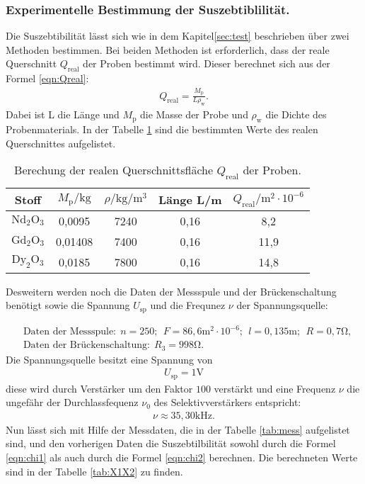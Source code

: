 \subsubsection{Experimentelle Bestimmung der Suszebtiblilität.}
Die Suszebtibilität lässt sich wie in dem Kapitel\ref{sec:test} beschrieben über zwei Methoden bestimmen. Bei beiden Methoden ist
erforderlich, dass der reale Querschnitt $Q_\mathrm{real}$ der Proben bestimmt wird.
Dieser berechnet sich aus der Formel \eqref{eqn:Qreal}:
\begin{align}
  Q_\mathrm{real}=\frac{M_\mathrm{p}}{L\rho_\mathrm{w}}\label{eqn:Qreal}.
\end{align}
Dabei ist L die Länge und $M_\mathrm{p}$ die Masse der Probe und
$\rho_\mathrm{w}$ die Dichte des Probenmaterials.
In der Tabelle \ref{tab:Q} sind die bestimmten Werte des realen Querschnittes aufgelistet.
\begin{table}
  \centering
  \caption{Berechung der realen Querschnittsfläche $Q_\mathrm{real}$ der Proben.}
  \label{tab:Q}
  \begin{tabular}{c c c c c}
  Stoff &  $M_\mathrm{p}/\si{\kilo\gram}$ & $\rho/\si{\kilo\gram\per\meter\tothe{3}}$ & Länge L/\si{\meter} & $Q_\mathrm{real}/\si{\meter\tothe{2}}\cdot 10^{-6}$\\
     \midrule
     $\mathrm{Nd_2O_3}$ & 0,0095  & 7240 & 0,16 & 8,2\\
     $\mathrm{Gd_2O_3}$ & 0,01408 & 7400 & 0,16 & 11,9\\
     $\mathrm{Dy_2O_3}$ & 0,0185  & 7800 & 0,16 & 14,8\\
     \bottomrule
  \end{tabular}
\end{table}
\FloatBarrier
Desweitern werden noch die Daten der Messspule und der Brückenschaltung benötigt sowie
die Spannung $U_\mathrm{sp}$ und die Frequnez $\nu$ der Spannungsquelle:

\begin{align*}
&\text{Daten der Messspule:}  \ \ n=250; \  \ F=86,6\si{\meter\tothe{2}}\cdot10^{-6}; \ \ l=0,135\si{\meter}; \ \ R= 0,7\si{\ohm}, \\
&\text{Daten der Brückenschaltung:} \ \  R_3=998\si{\ohm}.\
\end{align*}
Die Spannungsquelle besitzt eine Spannung von
\begin{align*}
U_\mathrm{sp}=1\si{\volt}
\end{align*}
diese wird durch Verstärker um den Faktor $100$ verstärkt
und eine Frequenz $\nu$ die ungefähr der Durchlassfequenz $\nu_0$
des Selektivverstärkers entspricht:
\begin{align*}
\nu\approx35,30\si{\kilo\hertz}.
\end{align*}
Nun lässt sich mit Hilfe der Messdaten, die in der Tabelle \ref{tab:mess}
aufgelistet sind, und den vorherigen Daten
die Suszebtilbilität \chi sowohl durch die Formel \eqref{eqn:chi1}
als auch  durch die Formel \eqref{eqn:chi2} berechnen.
Die berechneten Werte sind in der Tabelle \ref{tab:X1X2}
zu finden.

